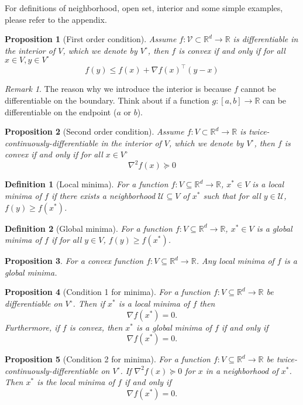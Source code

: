 \documentclass{article}
\newtheorem{definition}{Definition}
\newtheorem{proposition}{Proposition}
\newcommand{\R}{\mathbb{R}}
\DeclareMathOperator*{\1}{\mathbbm{1}}
\theoremstyle{definition}
\theoremstyle{remark}
\newtheorem{remark}{Remark}
\newcommand{\cU}{\mathcal{U}}
\newcommand{\cV}{\mathcal{V}}
\begin{document}
  \color{red}For definitions of neighborhood, open set, interior and some simple examples, please refer to the appendix.\color{black}
  
  \begin{proposition}[First order condition]
    Assume $f:\cV\subset \R^d\to \R$ is differentiable in the interior of $V$, which we denote by $V^\circ$, then $f$ is convex if and only if for all $x\in V, y\in V^\circ$
    \begin{equation*}
      f(y)\le f(x)+\nabla f(x)^\top (y-x)
    \end{equation*}
  \end{proposition}
  \begin{remark}
    The reason why we introduce the interior is because $f$ cannot be differentiable on the boundary. Think about if a function $g:[a,b]\to\R$ can be differentiable on the endpoint ($a$ or $b$).
  \end{remark}
  \begin{proposition}[Second order condition]
    Assume $f:V\subset \R^d\to \R$ is twice-continuously-differentiable in the interior of $V$, which we denote by $V^\circ$, then $f$ is convex if and only if for all $x\in V^\circ$
    \begin{equation*}
      \nabla^2f(x)\succeq 0
    \end{equation*}
  \end{proposition}
  \begin{definition}[Local minima]
    For a function $f:V\subseteq \R^d \to \R$, $x^*\in V$ is a local minima of $f$ if there exists a neighborhood $\cU\subseteq V$ of $x^*$ such that for all $y\in \cU$, $f(y)\ge f(x^*)$.
  \end{definition}
  \begin{definition}[Global minima]
    For a function $f:V\subseteq \R^d \to \R$, $x^*\in V$ is a global minima of $f$ if for all $y\in V$, $f(y)\ge f(x^*)$.
  \end{definition}
  \begin{proposition}
    For a convex function $f:V\subseteq \R^d \to \R$. Any local minima of $f$ is a global minima.
  \end{proposition}
  \begin{proposition}[Condition 1 for minima]
    For a function $f:V\subseteq \R^d \to \R$ be differentiable on $V^\circ$. Then if $x^*$ is a local minima of $f$ then 
    \begin{equation*}
      \nabla f(x^*)=0.
    \end{equation*}
    Furthermore, if $f$ is convex, then $x^*$ is a global minima of $f$ if and only if 
    \begin{equation*}
      \nabla f(x^*)=0.
    \end{equation*}
  \end{proposition}
  \begin{proposition}[Condition 2 for minima]
    For a function $f:V\subseteq \R^d \to \R$ be twice-continuously-differentiable on $V^\circ$. If $\nabla^2 f(x)\succeq 0$ for $x$ in a neighborhood of $x^*$. Then $x^*$ is the local minima of $f$ if and only if 
    \begin{equation*}
      \nabla f(x^*)=0.
    \end{equation*}
  \end{proposition}
\end{document}
